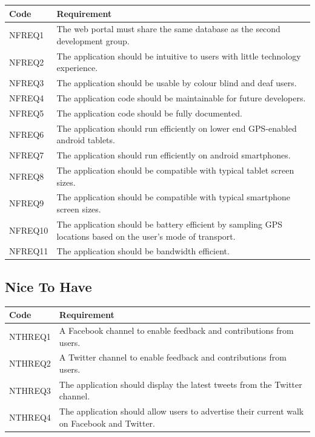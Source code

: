 \documentclass[11pt,a4paper]{article}
\begin{document}
\begin{longtable}{|p{2.5cm}p{13cm}|}
\hline
\textbf{Code} & \textbf{Requirement} \\

\hline
NFREQ1 & The web portal must share the same database as the second development group. \\ \hline
NFREQ2 & The application should be intuitive to users with little technology experience. \\ \hline
NFREQ3 & The application should be usable by colour blind and deaf users. \\ \hline
NFREQ4 & The application code should be maintainable for future developers. \\ \hline
NFREQ5 & The application code should be fully documented. \\ \hline
NFREQ6 & The application should run efficiently on lower end GPS-enabled android tablets. \\ \hline
NFREQ7 & The application should run efficiently on android smartphones. \\ \hline
NFREQ8 & The application should be compatible with typical tablet screen sizes. \\ \hline
NFREQ9 & The application should be compatible with typical smartphone screen sizes. \\ \hline
NFREQ10 & The application should be battery efficient by sampling GPS locations based on the user's mode of transport. \\ \hline
NFREQ11 & The application should be bandwidth efficient. \\ \hline
\end{longtable}

\subsection{Nice To Have}


\begin{longtable}{|p{2.5cm}p{13cm}|}
\hline
\textbf{Code} & \textbf{Requirement} \\

\hline
NTHREQ1 & A Facebook channel to enable feedback and contributions from users. \\ \hline
NTHREQ2 & A Twitter channel to enable feedback and contributions from users. \\ \hline
NTHREQ3 & The application should display the latest tweets from the Twitter channel. \\ \hline
NTHREQ4 & The application should allow users to advertise their current walk on Facebook and Twitter. \\ \hline
\end{longtable}
\end{document}
